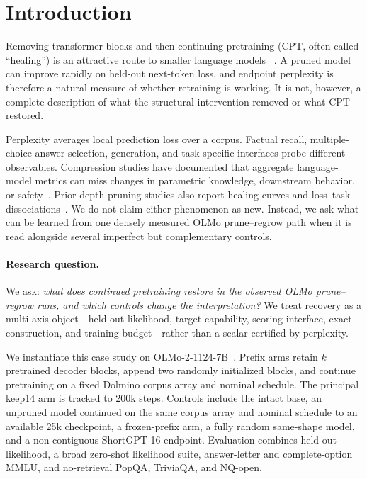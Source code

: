 \section{Introduction}
\label{sec:intro}

Removing transformer blocks and then continuing pretraining (CPT, often called
``healing'') is an attractive route to smaller language models
~\citep{gromov2024unreasonable,shortenedllama,men2024shortgpt,
yang2024laco}. A pruned model can improve rapidly on held-out next-token loss,
and endpoint perplexity is therefore a natural measure of whether retraining is
working. It is not, however, a complete description of what the structural
intervention removed or what CPT restored.

Perplexity averages local prediction loss over a corpus. Factual recall,
multiple-choice answer selection, generation, and task-specific interfaces
probe different observables. Compression studies have documented that
aggregate language-model metrics can miss changes in parametric knowledge,
downstream behavior, or safety~\citep{costcompression,beyondperplexity,
jaiswal2024truth}. Prior depth-pruning studies also report healing curves and
loss--task dissociations~\citep{gromov2024unreasonable,shortenedllama,minitron,
iterabre}. We do not claim either phenomenon as new. Instead, we ask what can be
learned from one densely measured OLMo prune--regrow path when it is read
alongside several imperfect but complementary controls.

\paragraph{Research question.}
We ask: \emph{what does continued pretraining restore in the observed OLMo
prune--regrow runs, and which controls change the interpretation?}
We treat recovery as a multi-axis object---held-out likelihood, target
capability, scoring interface, exact construction, and training budget---rather
than a scalar certified by perplexity.

We instantiate this case study on OLMo-2-1124-7B~\citep{olmo2}. Prefix arms retain
$k$ pretrained decoder blocks, append two randomly initialized blocks, and
continue pretraining on a fixed Dolmino corpus array and nominal schedule. The principal keep14 arm is
tracked to 200k steps. Controls include the intact base, an unpruned model
continued on the same corpus array and nominal schedule to an available 25k
checkpoint, a
frozen-prefix arm, a fully random same-shape model, and a non-contiguous
ShortGPT-16 endpoint. Evaluation combines held-out likelihood, a broad zero-shot
likelihood suite, answer-letter and complete-option MMLU, and no-retrieval
PopQA, TriviaQA, and NQ-open.

